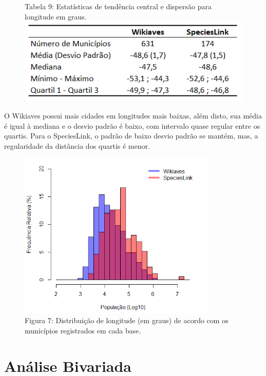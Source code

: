 \documentclass[12pt]{extarticle}
\newenvironment{resposta}{ \color{mygray}}{}
\begin{document}
\begin{figure}[h!]
\centering
{\scriptsize Tabela 9: Estatísticas de tendência central e dispersão para longitude em graus.}
\includegraphics{Imagens/T09.png}
\end{figure}

\begin{resposta}
O Wikiaves possui mais cidades em longitudes mais baixas, além disto, sua média é igual à mediana e o desvio padrão é baixo, com intervalo quase regular entre os quartis. Para o SpeciesLink, o padrão de baixo desvio padrão se mantém, mas, a regularidade da distância dos quartis é menor.
\end{resposta}


\begin{figure}[h!]
\centering
\includegraphics[height = 8cm]{Imagens/H06.png}
\\{\scriptsize Figura 7: Distribuição de longitude (em graus) de acordo com os municípios registrados em cada base.}
\end{figure}

\newpage

\section{Análise Bivariada}

\hrulefill
\end{document}

